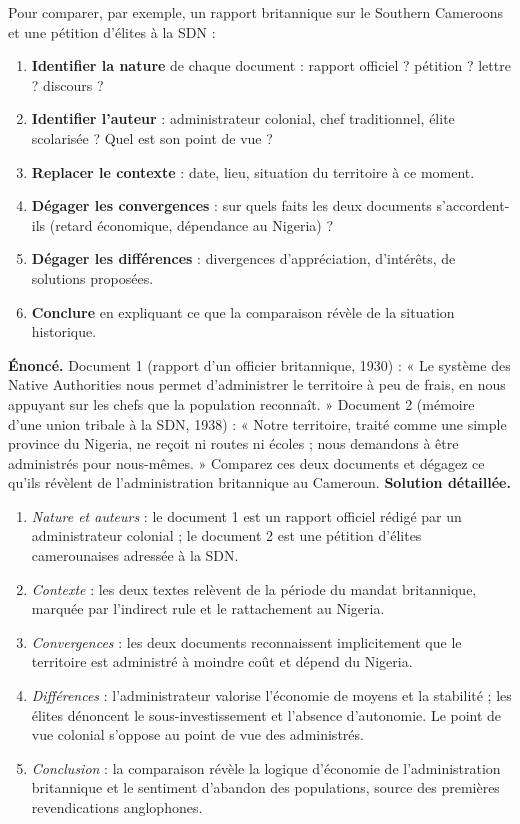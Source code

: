 \documentclass[11pt]{article}
\begin{document}
\begin{methode}
Pour comparer, par exemple, un rapport britannique sur le Southern Cameroons et une pétition d'élites à la SDN :
\begin{enumerate}
\item \textbf{Identifier la nature} de chaque document : rapport officiel ? pétition ? lettre ? discours ?
\item \textbf{Identifier l'auteur} : administrateur colonial, chef traditionnel, élite scolarisée ? Quel est son point de vue ?
\item \textbf{Replacer le contexte} : date, lieu, situation du territoire à ce moment.
\item \textbf{Dégager les convergences} : sur quels faits les deux documents s'accordent-ils (retard économique, dépendance au Nigeria) ?
\item \textbf{Dégager les différences} : divergences d'appréciation, d'intérêts, de solutions proposées.
\item \textbf{Conclure} en expliquant ce que la comparaison révèle de la situation historique.
\end{enumerate}
\end{methode}

\begin{exoresolu}
\textbf{Énoncé.} Document 1 (rapport d'un officier britannique, 1930) : « Le système des Native Authorities nous permet d'administrer le territoire à peu de frais, en nous appuyant sur les chefs que la population reconnaît. » Document 2 (mémoire d'une union tribale à la SDN, 1938) : « Notre territoire, traité comme une simple province du Nigeria, ne reçoit ni routes ni écoles ; nous demandons à être administrés pour nous-mêmes. » Comparez ces deux documents et dégagez ce qu'ils révèlent de l'administration britannique au Cameroun.
\tcblower
\textbf{Solution détaillée.}
\begin{enumerate}
\item \emph{Nature et auteurs} : le document 1 est un rapport officiel rédigé par un administrateur colonial ; le document 2 est une pétition d'élites camerounaises adressée à la SDN.
\item \emph{Contexte} : les deux textes relèvent de la période du mandat britannique, marquée par l'indirect rule et le rattachement au Nigeria.
\item \emph{Convergences} : les deux documents reconnaissent implicitement que le territoire est administré à moindre coût et dépend du Nigeria.
\item \emph{Différences} : l'administrateur valorise l'économie de moyens et la stabilité ; les élites dénoncent le sous-investissement et l'absence d'autonomie. Le point de vue colonial s'oppose au point de vue des administrés.
\item \emph{Conclusion} : la comparaison révèle la logique d'économie de l'administration britannique et le sentiment d'abandon des populations, source des premières revendications anglophones.
\end{enumerate}
\end{exoresolu}
\end{document}
